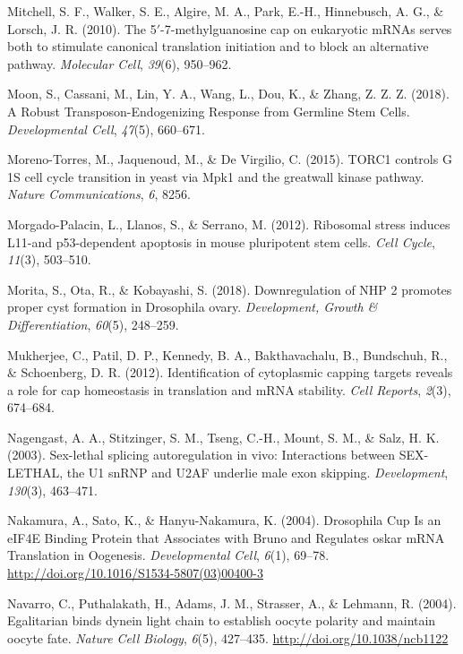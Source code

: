 \documentclass[12pt,twoside]{reedthesis}
\newlength{\cslhangindent}
\newenvironment{cslreferences}%
  {\setlength{\parindent}{0pt}%
  \everypar{\setlength{\hangindent}{\cslhangindent}}\ignorespaces}%
  {\par}
\begin{document}
\begin{cslreferences}
\leavevmode\hypertarget{ref-Mitchell2010}{}%
Mitchell, S. F., Walker, S. E., Algire, M. A., Park, E.-H., Hinnebusch, A. G., \& Lorsch, J. R. (2010). The 5\({'}\)-7-methylguanosine cap on eukaryotic mRNAs serves both to stimulate canonical translation initiation and to block an alternative pathway. \emph{Molecular Cell}, \emph{39}(6), 950--962.

\leavevmode\hypertarget{ref-Moon2018a}{}%
Moon, S., Cassani, M., Lin, Y. A., Wang, L., Dou, K., \& Zhang, Z. Z. Z. (2018). A Robust Transposon-Endogenizing Response from Germline Stem Cells. \emph{Developmental Cell}, \emph{47}(5), 660--671.

\leavevmode\hypertarget{ref-Moreno-Torres2015}{}%
Moreno-Torres, M., Jaquenoud, M., \& De Virgilio, C. (2015). TORC1 controls G 1S cell cycle transition in yeast via Mpk1 and the greatwall kinase pathway. \emph{Nature Communications}, \emph{6}, 8256.

\leavevmode\hypertarget{ref-Morgado-Palacin2012a}{}%
Morgado-Palacin, L., Llanos, S., \& Serrano, M. (2012). Ribosomal stress induces L11-and p53-dependent apoptosis in mouse pluripotent stem cells. \emph{Cell Cycle}, \emph{11}(3), 503--510.

\leavevmode\hypertarget{ref-Morita2018}{}%
Morita, S., Ota, R., \& Kobayashi, S. (2018). Downregulation of NHP 2 promotes proper cyst formation in Drosophila ovary. \emph{Development, Growth \& Differentiation}, \emph{60}(5), 248--259.

\leavevmode\hypertarget{ref-Mukherjee2012}{}%
Mukherjee, C., Patil, D. P., Kennedy, B. A., Bakthavachalu, B., Bundschuh, R., \& Schoenberg, D. R. (2012). Identification of cytoplasmic capping targets reveals a role for cap homeostasis in translation and mRNA stability. \emph{Cell Reports}, \emph{2}(3), 674--684.

\leavevmode\hypertarget{ref-Nagengast2003}{}%
Nagengast, A. A., Stitzinger, S. M., Tseng, C.-H., Mount, S. M., \& Salz, H. K. (2003). Sex-lethal splicing autoregulation in vivo: Interactions between SEX-LETHAL, the U1 snRNP and U2AF underlie male exon skipping. \emph{Development}, \emph{130}(3), 463--471.

\leavevmode\hypertarget{ref-Nakamura2004g}{}%
Nakamura, A., Sato, K., \& Hanyu-Nakamura, K. (2004). Drosophila Cup Is an eIF4E Binding Protein that Associates with Bruno and Regulates oskar mRNA Translation in Oogenesis. \emph{Developmental Cell}, \emph{6}(1), 69--78. \url{http://doi.org/10.1016/S1534-5807(03)00400-3}

\leavevmode\hypertarget{ref-Navarro2004b}{}%
Navarro, C., Puthalakath, H., Adams, J. M., Strasser, A., \& Lehmann, R. (2004). Egalitarian binds dynein light chain to establish oocyte polarity and maintain oocyte fate. \emph{Nature Cell Biology}, \emph{6}(5), 427--435. \url{http://doi.org/10.1038/ncb1122}


\end{cslreferences}
\end{document}
